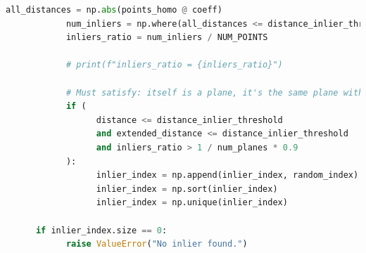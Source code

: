\documentclass[conference,onecolumn]{IEEEtran}
\begin{document}
\begin{enumerate}[label=\arabic{enumi}.]
\begin{enumerate}
\begin{lstlisting}[language=Python]
            all_distances = np.abs(points_homo @ coeff)
            num_inliers = np.where(all_distances <= distance_inlier_threshold)[0].size
            inliers_ratio = num_inliers / NUM_POINTS

            # print(f"inliers_ratio = {inliers_ratio}")

            # Must satisfy: itself is a plane, it's the same plane with inliers, and it has enough inliers
            if (
                  distance <= distance_inlier_threshold
                  and extended_distance <= distance_inlier_threshold
                  and inliers_ratio > 1 / num_planes * 0.9
            ):
                  inlier_index = np.append(inlier_index, random_index)
                  inlier_index = np.sort(inlier_index)
                  inlier_index = np.unique(inlier_index)

      if inlier_index.size == 0:
            raise ValueError("No inlier found.")


\end{lstlisting}
\end{enumerate}
\end{enumerate}
\end{document}
